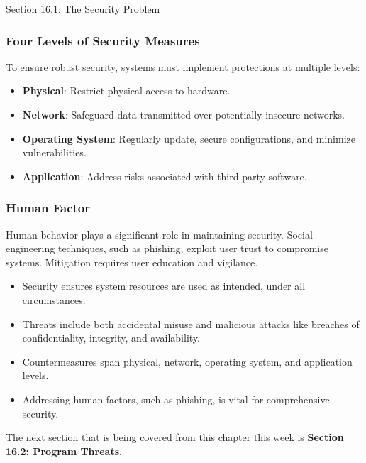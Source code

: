 \begin{notes}{Section 16.1: The Security Problem}
    \subsubsection*{Four Levels of Security Measures}
    
    To ensure robust security, systems must implement protections at multiple levels:
    \begin{itemize}
        \item \textbf{Physical}: Restrict physical access to hardware.
        \item \textbf{Network}: Safeguard data transmitted over potentially insecure networks.
        \item \textbf{Operating System}: Regularly update, secure configurations, and minimize vulnerabilities.
        \item \textbf{Application}: Address risks associated with third-party software.
    \end{itemize}
    
    \subsubsection*{Human Factor}
    
    Human behavior plays a significant role in maintaining security. Social engineering techniques, such as phishing, exploit user trust to compromise systems. Mitigation requires user education and 
    vigilance.
    
    \begin{highlight}
        \begin{itemize}
            \item Security ensures system resources are used as intended, under all circumstances.
            \item Threats include both accidental misuse and malicious attacks like breaches of confidentiality, integrity, and availability.
            \item Countermeasures span physical, network, operating system, and application levels.
            \item Addressing human factors, such as phishing, is vital for comprehensive security.
        \end{itemize}
    \end{highlight}
\end{notes}

The next section that is being covered from this chapter this week is \textbf{Section 16.2: Program Threats}.


